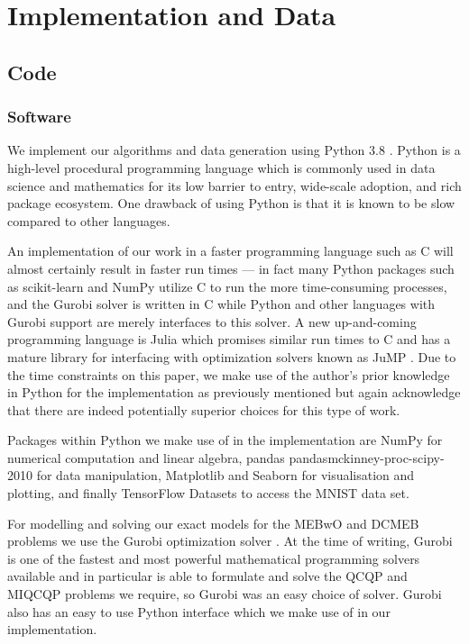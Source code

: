 \documentclass[11pt,twoside]{report}
\theoremstyle{definition}
\numberwithin{theorem}{section}
\numberwithin{definition}{section}
\numberwithin{lemma}{section}
\numberwithin{proposition}{section}
\numberwithin{equation}{section}
\numberwithin{figure}{section}
\begin{document}
\chapter{Implementation and Data}\label{implementation}
\section{Code}
\subsection{Software}\label{sec:software}
We implement our algorithms and data generation using Python 3.8 \cite{python}. Python is a high-level procedural programming language which is commonly used in data science and mathematics for its low barrier to entry, wide-scale adoption, and rich package ecosystem. One drawback of using Python is that it is known to be slow compared to other languages.

An implementation of our work in a faster programming language such as C \cite{kernighan2006c} will almost certainly result in faster run times --- in fact many Python packages such as scikit-learn \cite{scikit-learn} and NumPy \cite{numpy} utilize C to run the more time-consuming processes, and the Gurobi \cite{gurobi} solver is written in C while Python and other languages with Gurobi support are merely interfaces to this solver. A new up-and-coming programming language is Julia \cite{bezanson2017julia} which promises similar run times to C and has a mature library for interfacing with optimization solvers known as JuMP \cite{jump}. Due to the time constraints on this paper, we make use of the author's prior knowledge in Python for the implementation as previously mentioned but again acknowledge that there are indeed potentially superior choices for this type of work.

Packages within Python we make use of in the implementation are NumPy \cite{numpy} for numerical computation and linear algebra, pandas \cite{pandasjeff_reback_2021_5060318}{pandasmckinney-proc-scipy-2010} for data manipulation, Matplotlib \cite{matplotlib} and Seaborn \cite{seaborn} for visualisation and plotting, and finally TensorFlow Datasets \cite{TFDS} to access the MNIST \cite{lecun2010mnist} data set.

For modelling and solving our exact models for the MEBwO and DCMEB problems we use the Gurobi optimization solver \cite{gurobi}. At the time of writing, Gurobi is one of the fastest and most powerful mathematical programming solvers available and in particular is able to formulate and solve the QCQP and MIQCQP problems we require, so Gurobi was an easy choice of solver. Gurobi also has an easy to use Python interface which we make use of in our implementation.
\end{document}
